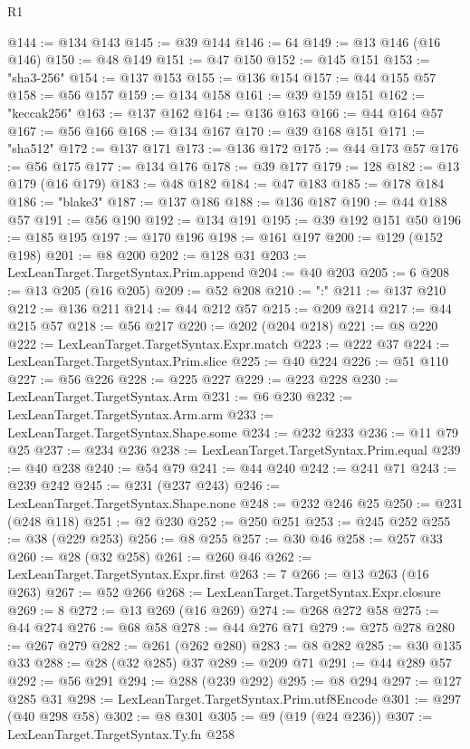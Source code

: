 \begin{lexlean}{R1}
\begin{coremodule}
@144 := @134 @143
@145 := @39 @144
@146 := 64
@149 := @13 @146 (@16 @146)
@150 := @48 @149
@151 := @47 @150
@152 := @145 @151
@153 := "sha3-256"
@154 := @137 @153
@155 := @136 @154
@157 := @44 @155 @57
@158 := @56 @157
@159 := @134 @158
@161 := @39 @159 @151
@162 := "keccak256"
@163 := @137 @162
@164 := @136 @163
@166 := @44 @164 @57
@167 := @56 @166
@168 := @134 @167
@170 := @39 @168 @151
@171 := "sha512"
@172 := @137 @171
@173 := @136 @172
@175 := @44 @173 @57
@176 := @56 @175
@177 := @134 @176
@178 := @39 @177
@179 := 128
@182 := @13 @179 (@16 @179)
@183 := @48 @182
@184 := @47 @183
@185 := @178 @184
@186 := "blake3"
@187 := @137 @186
@188 := @136 @187
@190 := @44 @188 @57
@191 := @56 @190
@192 := @134 @191
@195 := @39 @192 @151 @50
@196 := @185 @195
@197 := @170 @196
@198 := @161 @197
@200 := @129 (@152 @198)
@201 := @8 @200
@202 := @128 @31
@203 := LexLeanTarget.TargetSyntax.Prim.append
@204 := @40 @203
@205 := 6
@208 := @13 @205 (@16 @205)
@209 := @52 @208
@210 := ":"
@211 := @137 @210
@212 := @136 @211
@214 := @44 @212 @57
@215 := @209 @214
@217 := @44 @215 @57
@218 := @56 @217
@220 := @202 (@204 @218)
@221 := @8 @220
@222 := LexLeanTarget.TargetSyntax.Expr.match
@223 := @222 @37
@224 := LexLeanTarget.TargetSyntax.Prim.slice
@225 := @40 @224
@226 := @51 @110
@227 := @56 @226
@228 := @225 @227
@229 := @223 @228
@230 := LexLeanTarget.TargetSyntax.Arm
@231 := @6 @230
@232 := LexLeanTarget.TargetSyntax.Arm.arm
@233 := LexLeanTarget.TargetSyntax.Shape.some
@234 := @232 @233
@236 := @11 @79 @25
@237 := @234 @236
@238 := LexLeanTarget.TargetSyntax.Prim.equal
@239 := @40 @238
@240 := @54 @79
@241 := @44 @240
@242 := @241 @71
@243 := @239 @242
@245 := @231 (@237 @243)
@246 := LexLeanTarget.TargetSyntax.Shape.none
@248 := @232 @246 @25
@250 := @231 (@248 @118)
@251 := @2 @230
@252 := @250 @251
@253 := @245 @252
@255 := @38 (@229 @253)
@256 := @8 @255
@257 := @30 @46
@258 := @257 @33
@260 := @28 (@32 @258)
@261 := @260 @46
@262 := LexLeanTarget.TargetSyntax.Expr.first
@263 := 7
@266 := @13 @263 (@16 @263)
@267 := @52 @266
@268 := LexLeanTarget.TargetSyntax.Expr.closure
@269 := 8
@272 := @13 @269 (@16 @269)
@274 := @268 @272 @58
@275 := @44 @274
@276 := @68 @58
@278 := @44 @276 @71
@279 := @275 @278
@280 := @267 @279
@282 := @261 (@262 @280)
@283 := @8 @282
@285 := @30 @135 @33
@288 := @28 (@32 @285) @37
@289 := @209 @71
@291 := @44 @289 @57
@292 := @56 @291
@294 := @288 (@239 @292)
@295 := @8 @294
@297 := @127 @285 @31
@298 := LexLeanTarget.TargetSyntax.Prim.utf8Encode
@301 := @297 (@40 @298 @58)
@302 := @8 @301
@305 := @9 (@19 (@24 @236))
@307 := LexLeanTarget.TargetSyntax.Ty.fn @258

\end{coremodule}
\end{lexlean}
